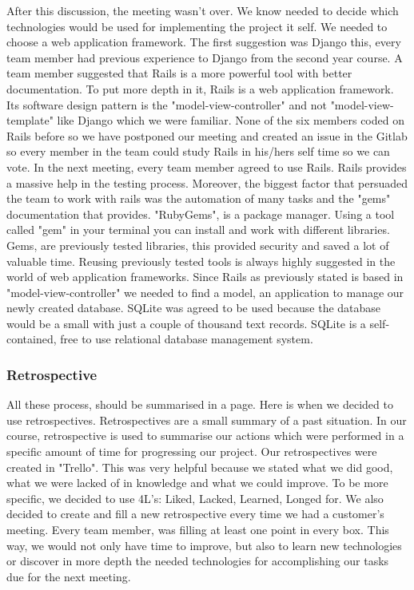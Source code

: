 \documentclass{l3proj}
\begin{document}
 After this discussion, the meeting wasn't over. We know needed to decide which technologies would be used for implementing the project it self. We needed to choose a web application framework. The first suggestion was Django this, every team member had previous experience to Django from the second year course. A team member suggested that Rails is a more powerful tool with better documentation. To put more depth in it, Rails is a web application framework. Its software design pattern is the "model-view-controller" and not "model-view-template" like Django which we were familiar. None of the six members coded on Rails before so we have postponed our meeting and created an issue in the Gitlab so every member in the team could study Rails in his/hers self time so we can vote. In the next meeting, every team member agreed to use Rails. Rails provides a massive help in the testing process. Moreover, the biggest factor that persuaded the team to work with rails was the automation of many tasks and the "gems" documentation that provides. "RubyGems", is a package manager. Using a tool called "gem" in your terminal you can install and work with different libraries. Gems, are previously tested libraries, this provided security and saved a lot of valuable time. Reusing previously tested tools is always highly suggested in the world of web application frameworks.
  Since Rails as previously stated is based in "model-view-controller" we needed to find a model, an application to manage our newly created database. SQLite was agreed to be used because the database would be a small with just a couple of thousand text records. SQLite is a self-contained, free to use relational database management system.
 
 \subsubsection{Retrospective}
\label{retrospective}
 
 All these process, should be summarised in a page. Here is when we decided to use retrospectives. Retrospectives are a small summary of a past situation. In our course, retrospective is used to summarise our actions which were performed in a specific amount of time for progressing our project. Our retrospectives were created in "Trello". This was very helpful because we stated what we did good, what we were lacked of in knowledge and what we could improve. To be more specific, we decided to use 4L's: Liked, Lacked, Learned, Longed for. We also decided to create and fill a new retrospective every time we had a customer's meeting. Every team member, was filling at least one point in every box. This way, we would not only have time to improve, but also to learn new technologies or discover in more depth the needed technologies for accomplishing our tasks due for the next meeting.
\end{document}
